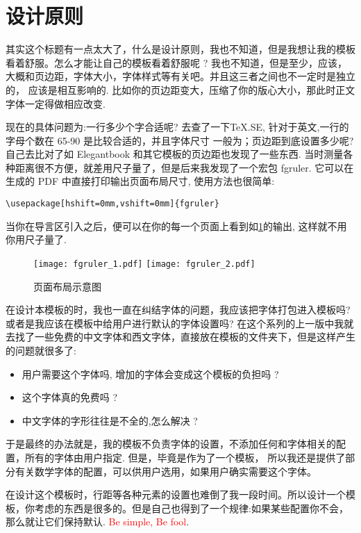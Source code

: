 \documentclass[
  hyper,    
  lang=cn,
  class=book,
  mathSpec={envStyle=leftbar, alias},
  toc={redef}
]{zlatex}
\let\cmd\ztexverb
\begin{document}
\section{设计原则}
其实这个标题有一点太大了，什么是设计原则，我也不知道，但是我想让我的模板看着舒服。怎么才能让自己的模板看着舒服呢 ?
我也不知道，但是至少，应该，大概和页边距，字体大小，字体样式等有关吧。并且这三者之间也不一定时是独立的，
应该是相互影响的. 比如你的页边距变大，压缩了你的版心大小，那此时正文字体一定得做相应改变. 

现在的具体问题为:一行多少个字合适呢? 去查了一下\TeX.SE, 针对于英文,一行的字母个数在 65-90 是比较合适的，并且字体尺寸
一般为\cmd{10pt,11pt,12pt}；页边距到底设置多少呢? 自己去比对了如 Elegantbook 和其它模板的页边距也发现了一些东西. 
当时测量各种距离很不方便，就差用尺子量了，但是后来我发现了一个宏包 fgruler. 它可以在生成的 PDF 中直接打印输出页面布局尺寸,
使用方法也很简单:

\begin{verbatim}
\usepackage[hshift=0mm,vshift=0mm]{fgruler}
\end{verbatim}

当你在导言区引入之后，便可以在你的每一个页面上看到如\cref{fig:fgruler-example}的输出, 这样就不用你用尺子量了.

\begin{figure}[!htb]
    \centering
    \texttt{[image: fgruler\_1.pdf]}
    \texttt{[image: fgruler\_2.pdf]}
    \caption{页面布局示意图}
    \label{fig:fgruler-example}
\end{figure}

在设计本模板的时，我也一直在纠结字体的问题，我应该把字体打包进入模板吗? 或者是我应该在模板中给用户进行默认的字体设置吗?
在这个系列的上一版中我就去找了一些免费的中文字体和西文字体，直接放在模板的文件夹下，但是这样产生的问题就很多了:

\begin{itemize}
    \item 用户需要这个字体吗, 增加的字体会变成这个模板的负担吗 ?
    \item 这个字体真的免费吗 ?
    \item 中文字体的字形往往是不全的,怎么解决 ? 
\end{itemize}

于是最终的办法就是，我的模板不负责字体的设置，不添加任何和字体相关的配置，所有的字体由用户指定. 但是，毕竟是作为了一个模板，
所以我还是提供了部分有关数学字体的配置，可以供用户选用，如果用户确实需要这个字体。

在设计这个模板时，行距等各种元素的设置也难倒了我一段时间。所以设计一个模板，你考虑的东西是很多的。但是自己也得到了一个规律:如果某些配置你不会，
那么就让它们保持默认. \textcolor{red}{Be simple, Be fool}.
\end{document}
